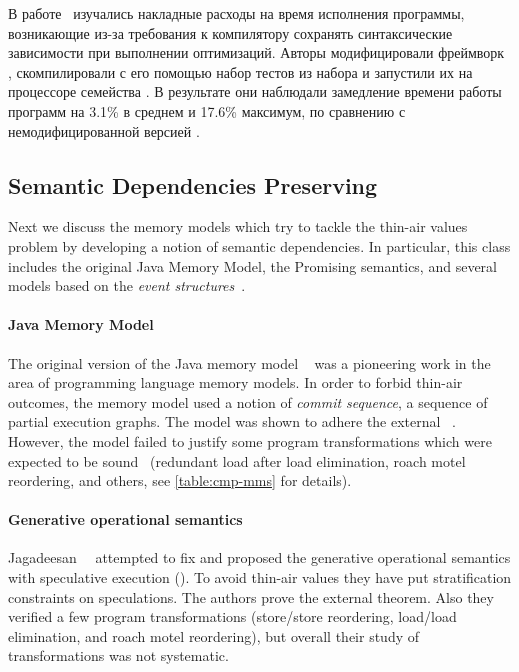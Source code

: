 В работе~\cite{Ou-Demsky:OOPSLA18} изучались накладные расходы
на время исполнения программы, возникающие из-за требования 
к компилятору сохранять синтаксические зависимости при выполнении оптимизаций. 
Авторы модифицировали фреймворк \LLVM, скомпилировали с его помощью 
набор тестов из набора \SPECCPU и запустили их на процессоре семейства .
В результате они наблюдали замедление времени работы программ 
на 3.1\% в среднем и 17.6\% максимум, по сравнению с немодифицированной версией \LLVM.  

\subsection{Semantic Dependencies Preserving}
\label{sec:catalog:sdeprf}

Next we discuss the memory models 
which try to tackle the thin-air values problem 
by developing a notion of semantic dependencies. 
In particular, this class includes the original Java Memory Model, 
the Promising semantics, and several models based 
on the \emph{event structures}~\cite{Winskel:86}.

\paragraph{Java Memory Model}
\label{sec:catalog:jmm}

The original version of the Java memory model \JMM~\cite{Manson-al:POPL05}
was a pioneering work in the area of programming language memory models. 
In order to forbid thin-air outcomes, the memory model used 
a notion of \emph{commit sequence}, \ie a sequence of partial execution graphs.
The model was shown to adhere the external \DRF~\cite{Huisman-Petri:CONCUR07}.
However, the model failed to justify some program transformations 
which were expected to be sound~\cite{Sevcik-Aspinall:ECOOP08} 
(\eg redundant load after load elimination, roach motel reordering, and others,
see \cref{table:cmp-mms} for details). 

\paragraph{Generative operational semantics}

Jagadeesan~\etal~\cite{Jagadeesan-al:ESOP10} attempted to fix \JMM 
and proposed the generative operational semantics 
with speculative execution (\GOS).
To avoid thin-air values they have put stratification constraints 
on speculations. The authors prove the external \DRF theorem. 
Also they verified a few program transformations 
(store/store reordering, load/load elimination, and roach motel reordering), 
but overall their study of transformations was not systematic.  

